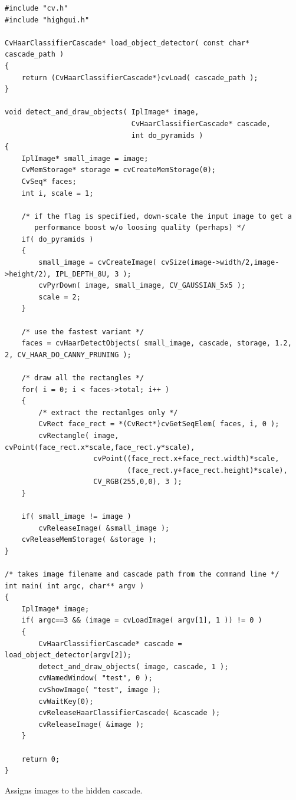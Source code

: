 \ifC
\begin{lstlisting}
#include "cv.h"
#include "highgui.h"

CvHaarClassifierCascade* load_object_detector( const char* cascade_path )
{
    return (CvHaarClassifierCascade*)cvLoad( cascade_path );
}

void detect_and_draw_objects( IplImage* image,
                              CvHaarClassifierCascade* cascade,
                              int do_pyramids )
{
    IplImage* small_image = image;
    CvMemStorage* storage = cvCreateMemStorage(0);
    CvSeq* faces;
    int i, scale = 1;

    /* if the flag is specified, down-scale the input image to get a
       performance boost w/o loosing quality (perhaps) */
    if( do_pyramids )
    {
        small_image = cvCreateImage( cvSize(image->width/2,image->height/2), IPL_DEPTH_8U, 3 );
        cvPyrDown( image, small_image, CV_GAUSSIAN_5x5 );
        scale = 2;
    }

    /* use the fastest variant */
    faces = cvHaarDetectObjects( small_image, cascade, storage, 1.2, 2, CV_HAAR_DO_CANNY_PRUNING );

    /* draw all the rectangles */
    for( i = 0; i < faces->total; i++ )
    {
        /* extract the rectanlges only */
        CvRect face_rect = *(CvRect*)cvGetSeqElem( faces, i, 0 );
        cvRectangle( image, cvPoint(face_rect.x*scale,face_rect.y*scale),
                     cvPoint((face_rect.x+face_rect.width)*scale,
                             (face_rect.y+face_rect.height)*scale),
                     CV_RGB(255,0,0), 3 );
    }

    if( small_image != image )
        cvReleaseImage( &small_image );
    cvReleaseMemStorage( &storage );
}

/* takes image filename and cascade path from the command line */
int main( int argc, char** argv )
{
    IplImage* image;
    if( argc==3 && (image = cvLoadImage( argv[1], 1 )) != 0 )
    {
        CvHaarClassifierCascade* cascade = load_object_detector(argv[2]);
        detect_and_draw_objects( image, cascade, 1 );
        cvNamedWindow( "test", 0 );
        cvShowImage( "test", image );
        cvWaitKey(0);
        cvReleaseHaarClassifierCascade( &cascade );
        cvReleaseImage( &image );
    }

    return 0;
}
\end{lstlisting}

Assigns images to the hidden cascade.

